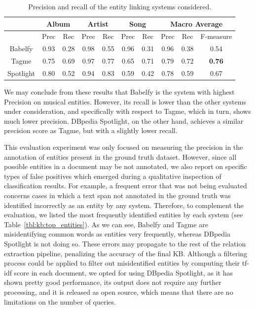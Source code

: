 \begin{table}[]
\scriptsize
\centering
	\begin{tabular}{ c c c c c c c c c c }
	\hline
& \multicolumn{2}{c}{Album} & \multicolumn{2}{c}{Artist} & \multicolumn{2}{c}{Song} & \multicolumn{3}{c}{Macro Average}  \\
\hline
	& Prec & Rec & Prec & Rec & Prec & Rec & Prec & Rec & F-measure \\
	\hline
Babelfy & 0.93 & 0.28 & 0.98 & 0.55 & 0.96 & 0.31 & 0.96 & 0.38 & 0.54 \\
Tagme & 0.75 & 0.69 & 0.97 & 0.77 & 0.65 & 0.71 & 0.79 & 0.72 & \textbf{0.76} \\
Spotlight & 0.80 & 0.52 & 0.94 & 0.83 & 0.59 & 0.42 & 0.78 & 0.59 & 0.67 \\
\hline
	\end{tabular}
	\caption{Precision and recall of the entity linking systems considered.}
	\label{tbl:kb:res_categories}
\end{table}

We may conclude from these results that Babelfy is the system with highest Precision on musical entities. However, its recall is lower than the other systems under consideration, and specifically with respect to Tagme, which in turn, shows much lower precision. DBpedia Spotlight, on the other hand, achieves a similar precision score as Tagme, but with a slightly lower recall. 

This evaluation experiment was only focused on measuring the precision in the annotation of entities present in the ground truth dataset. However, since all possible entities in a document may be not annotated, we also report on specific types of false positives which emerged during a qualitative inspection of classification results. For example, a frequent error that was not being evaluated concerns cases in which a text span not annotated in the ground truth was identified incorrectly as an entity by any system. Therefore, to complement the evaluation, we listed the most frequently identified entities by each system (see Table~\ref{tbl:kb:top_entities}). As we can see, Babelfy and Tagme are misidentifying common words as entities very frequently, whereas DBpedia Spotlight is not doing so. 
These errors may propagate to the rest of the relation extraction pipeline, penalizing the accuracy of the final KB.
Although a filtering process could be applied to filter out misidentified entities by computing their tf-idf score in each document, we opted for using DBpedia Spotlight, as it has shown pretty good performance, its output does not require any further processing, and it is released as open source, which means that there are no limitations on the number of queries.

